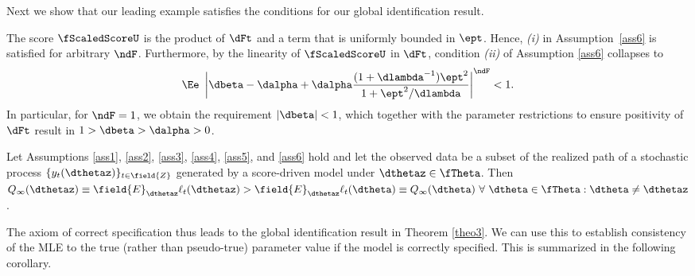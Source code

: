 Next we show that our leading example satisfies the conditions for our global identification result.  
 \begin{exmc} %
The score $\fScaledScoreU$ is the product of $\dFt$ and a term that is uniformly bounded in $\ept$. Hence,  \textit{(i)} in Assumption~\ref{ass6} is satisfied for arbitrary $\ndF$.
Furthermore, by the linearity of $\fScaledScoreU$ in $\dFt$, condition \textit{(ii)} of Assumption \ref{ass6} collapses to 
\[
	\Ee\ \left| \dbeta - \dalpha + \dalpha \frac{(1+\dlambda^{-1})\ept^2}{1+\ept^2/\dlambda} \right|^{\ndF}
	< 1.
\]
In particular, for $\ndF=1$, we obtain the requirement $|\dbeta|<1$, which together with the parameter restrictions to ensure positivity of $\dFt$ result in $1>\dbeta>\dalpha>0$.
\end{exmc}

 



\begin{theo} \label{theo3}  
    Let Assumptions \ref{ass1}, \ref{ass2}, \ref{ass3}, \ref{ass4}, \ref{ass5}, and \ref{ass6} 
    hold and let the observed data be a subset of the realized path of a stochastic process $\{y_{t}(\dthetaz)\}_{t \in \field{Z}}$ generated by a score-driven model under $\dthetaz \in \fTheta$. 
    Then $Q_{\infty}(\dthetaz)\equiv \field{E}_{\dthetaz} \ell_{t}(\dthetaz) > \field{E}_{\dthetaz} \ell_{t}(\dtheta) \equiv Q_{\infty}(\dtheta) \ \forall \ \dtheta \in \fTheta : \dtheta \neq \dthetaz$.
\end{theo}

The axiom of correct specification thus leads to the global identification result in Theorem \ref{theo3}.
We can use this to establish consistency of the MLE to the true (rather than pseudo-true) parameter value if the model is correctly specified.
This is summarized in the following corollary.

